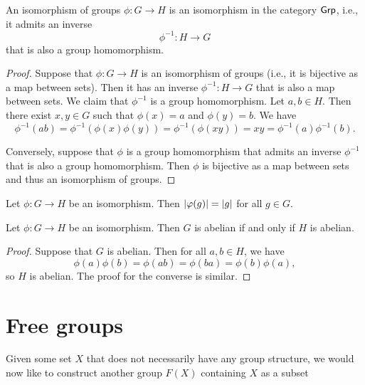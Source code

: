\begin{theorem}
    An isomorphism of groups \(\phi: G \to H\) is an isomorphism in the category
    \(\mathsf{Grp}\), i.e., it admits an inverse
    \[
        \phi^{-1}: H \to G
    \]
    that is also a group homomorphism.
\end{theorem}

\begin{proof}
    Suppose that \(\phi: G \to H\) is an isomorphism of groups (i.e., it is
    bijective as a map between sets). Then it has an inverse \(\phi^{-1}: H \to
    G\) that is also a map between sets. We claim that \(\phi^{-1}\) is a group
    homomorphism. Let \(a, b \in H\). Then there exist \(x, y \in G\) such that
    \(\phi(x) = a\) and \(\phi(y) = b\). We have
    \[
        \phi^{-1}(ab) = \phi^{-1}(\phi(x)\phi(y)) = \phi^{-1}(\phi(xy)) = xy = \phi^{-1}(a)\phi^{-1}(b).
    \]
    
    Conversely, suppose that \(\phi\) is a group homomorphism that admits an
    inverse \(\phi^{-1}\) that is also a group homomorphism. Then \(\phi\) is
    bijective as a map between sets and thus an isomorphism of groups.
\end{proof}


\begin{theorem}
    Let \(\phi: G \to H\) be an isomorphism. Then \(\lvert \varphi(g) \rvert =
    \lvert g \rvert\) for all \(g \in G\).
\end{theorem}

\begin{theorem}
    Let \(\phi : G \to H\) be an isomorphism. Then \(G\) is abelian if and only
    if \(H\) is abelian.
\end{theorem}

\begin{proof}
    Suppose that \(G\) is abelian. Then for all \(a, b \in H\), we have
    \[
        \phi(a)\phi(b) = \phi(ab) = \phi(ba) = \phi(b)\phi(a),
    \]
    so \(H\) is abelian. The proof for the converse is similar.
\end{proof}

\section{Free groups}

\begin{sectionthm}
    Given some set \(X\) that does not necessarily have any group structure, we
    would now like to construct another group \(F(X)\) containing \(X\) as a
    subset
\end{sectionthm}

